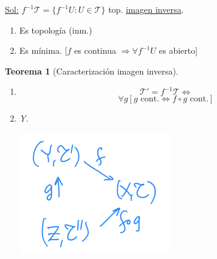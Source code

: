 \documentclass[10pt,a4paper,openright]{book}
\theoremstyle{break}
\newtheorem*{theo}{Teorema}
\begin{document}
\underline{Sol:} $f^{-1} \mathcal{T} = \{f^{-1}U: U \in \mathcal{T}\}$ top. \underline{imagen inversa}. 
\begin{enumerate}
    \item Es topología (inm.)
    \item Es mínima. [$f$ es continua $\Rightarrow \forall f^{-1}U$ es abierto]
\end{enumerate}


\begin{theo}[Caracterización imagen inversa]
\begin{enumerate}
    \item
    \[
    \mathcal{T}' = f^{-1}\mathcal{T} \Leftrightarrow  
    \]
    \begin{equation}
        \forall g \left[ g \text{ cont.} \Leftrightarrow f \circ g \text{ cont.} \right]
    \end{equation}

    \item Y.
    \begin{center}
        \includegraphics[scale=0.3]{images/caracterizacion_img_inv} 
    \end{center}
\end{enumerate}
\end{theo}
\end{document}

